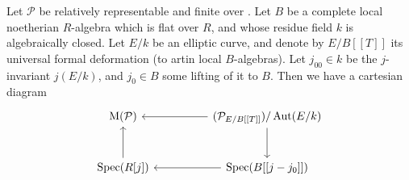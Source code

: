 \begin{kprop}\label{prop:8.2.3}
Let $\mathcal{P}$ be relatively representable and finite over \EllR. Let $B$ be a complete local noetherian $R$-algebra which is flat over $R$, and whose residue field $k$ is algebraically closed. Let $E/k$ be an elliptic curve, and denote by $E/B[[T]]$ its universal formal deformation (to artin local $B$-algebras). Let $j_{00} \in k$ be the $j$-invariant $j(E/k)$, and $j_0 \in B$ some lifting of it to $B$. Then we have a cartesian diagram
\[
\begin{tikzcd}[column sep=huge, row sep=large]
\Mcoarse(\mathcal{P}) & (\mathcal{P}_{E/B[[T]]})/\Aut(E/k) \arrow[l] \arrow[d] \\
\Spec(R[j]) \arrow[u] & \Spec(B[[j - j_0]]) \arrow[l]
\end{tikzcd}
\]
\end{kprop}

